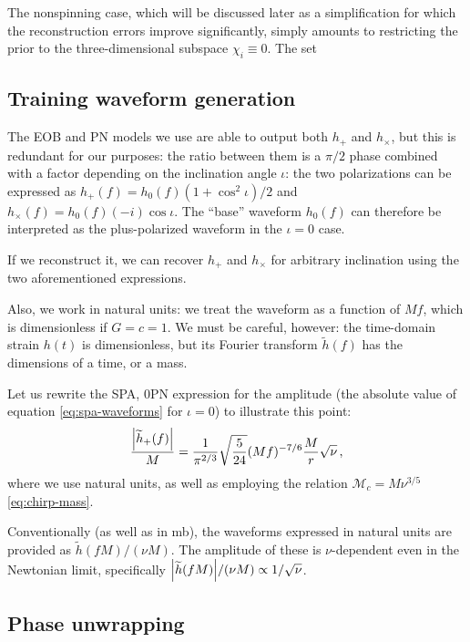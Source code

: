 \documentclass[main.tex]{subfiles}
\begin{document}
The nonspinning case, which will be discussed later as a simplification for which the reconstruction errors improve significantly, simply amounts to restricting the prior to the three-dimensional subspace \(\chi _i \equiv 0\). 
The set

\subsection{Training waveform generation}

The \ac{EOB} and \ac{PN} models we use are able to output both \(h_{+}\) and \(h_{\times }\), but this is redundant for our purposes: the ratio between them is a \(\pi /2\) phase combined with a factor depending on the inclination angle \(\iota \): the two polarizations can be expressed as \(h_{+} (f) = h_0 (f) (1 + \cos^2 \iota ) / 2\) and \(h_{\times }( f) = h_0 (f) (-i) \cos \iota \). 
The ``base'' waveform \(h_0 (f)\) can therefore be interpreted as the plus-polarized waveform in the \(\iota = 0\) case. 

If we reconstruct it, we can recover \(h_{+}\) and \(h_{\times }\) for arbitrary inclination using the two aforementioned expressions.

Also, we work in natural units: we treat the waveform as a function of \(Mf\), which is dimensionless if \(G = c = 1\).
We must be careful, however: the time-domain strain \(h(t)\) is dimensionless, but its Fourier transform \(\widetilde{h}(f)\) has the dimensions of a time, or a mass.

Let us rewrite the \ac{SPA}, 0PN expression for the amplitude (the absolute value of equation \ref{eq:spa-waveforms} for \(\iota = 0\)) to illustrate this point: 
%
\begin{align}
\frac{\abs{\widetilde{h}_+ (f)}}{M} = \frac{1}{\pi^{2/3}} \sqrt{ \frac{5}{24}}
(Mf)^{-7/6} \frac{M}{r} \sqrt{\nu }
\,,
\end{align}
%
where we use natural units, as well as employing the relation \(\mathcal{M}_c = M \nu^{3/5}\) \eqref{eq:chirp-mass}.

Conventionally (as well as in \ac{mb}), the waveforms expressed in natural units are provided as \(\widetilde{h}(fM) / (\nu M)\). 
The amplitude of these is  \(\nu \)-dependent even in the Newtonian limit, specifically \(\abs{\widetilde{h}(fM)} / (\nu M) \propto 1 / \sqrt{\nu }\). 

\subsection{Phase unwrapping} \label{sec:unwrapping}
\end{document}
